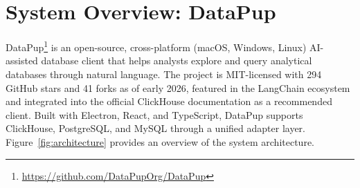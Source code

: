 \documentclass[sigconf, nonacm]{acmart}
\begin{document}
\section{System Overview: DataPup}
\label{sec:system}

DataPup\footnote{\url{https://github.com/DataPupOrg/DataPup}} is an open-source, cross-platform (macOS, Windows, Linux) AI-assisted database client that helps analysts explore and query analytical databases through natural language. The project is MIT-licensed with 294 GitHub stars and 41 forks as of early 2026, featured in the LangChain ecosystem and integrated into the official ClickHouse documentation as a recommended client. Built with Electron, React, and TypeScript, DataPup supports ClickHouse, PostgreSQL, and MySQL through a unified adapter layer. Figure~\ref{fig:architecture} provides an overview of the system architecture.
\end{document}
